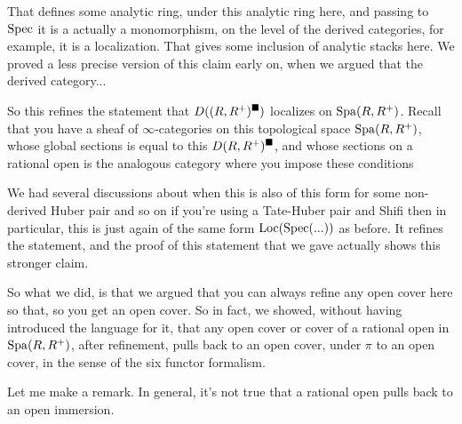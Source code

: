 That defines some analytic ring, under this analytic ring here, and passing to $\operatorname{Spec}$ it is a actually a monomorphism, on the level of the derived categories, for example, it is a localization. 
That gives some inclusion of analytic stacks here. 
We proved a less precise version of this claim early on, when we argued that the derived category...

So this refines the statement that $D((R, R^{+})^\blacksquare)$ localizes on $\operatorname{Spa}(R, R^{+})$.
Recall that you have a sheaf of $\infty$-categories on this topological space $\operatorname{Spa}(R, R^{+})$, whose global sections is equal to this $D(R, R^{+})^\blacksquare$, and whose sections on a rational open is the analogous category where you impose these conditions 

We had several discussions about when this is also of this form for some non-derived Huber pair and so on if you're using a Tate-Huber pair and Shifi  then in particular, this is just again of the same form $\operatorname{Loc}(\operatorname{Spec}(...))$ as before.
It refines the statement, and the proof of this statement that we gave actually shows this stronger claim. 

So what we did, is that we argued that you can always refine any open cover here so that, so you get an open cover. So in fact, we showed, without having introduced the language for it, that any open cover or cover of a rational open in $\operatorname{Spa}(R, R^{+})$, after refinement, pulls back to an open cover, under $\pi$ to an open cover, in the sense of the six functor formalism.

\begin{remark}
Let me make a remark. In general, it's not true that a rational open pulls back to an open immersion. 
\end{remark}

